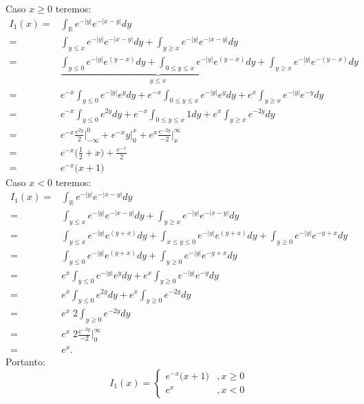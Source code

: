 \documentclass{article}
\begin{document}
\begin{enumerate}
\begin{enumerate}
\begin{enumerate}
\begin{enumerate}
						Caso $x \geq 0$ teremos:
						$$
						\begin{aligned}
						I_{1}(x) 
						= & \int_{\mathbb{R}}e^{-|y|}e^{-|x-y|} dy \\
						= & \int_{y \leq x }e^{-|y|}e^{-|x-y|} dy + \int_{y \geq x }e^{-|y|}e^{-|x-y|} dy \\
						= & \underbrace{ \int_{y \leq 0 }e^{-|y|}e^{(y-x)} dy + \int_{0 \leq y \leq x }e^{-|y|}e^{(y-x)} dy }_{ y \leq x} + \int_{y \geq x }e^{-|y|}e^{-(y-x)} dy \\
						= & e^{-x} \int_{y \leq 0 }e^{-|y|}e^{y} dy + e^{-x} \int_{0 \leq y \leq x }e^{-|y|}e^{y} dy + e^{x} \int_{y \geq x }e^{-|y|}e^{-y} dy \\
						= & e^{-x}\int_{y \leq 0}e^{2y} dy + e^{-x} \int_{0 \leq y \leq x } 1 dy  + e^{x} \int_{y \geq x}e^{-2y} dy \\
						= & e^{-x} \frac{e^{2y}}{2} \Big|^{0}_{-\infty} + e^{-x} y \Big|^{x}_{0} + e^{x} \frac{e^{-2y}}{-2} \Big|^{\infty}_{x} \\
						= & e^{-x} \Big(\frac{1}{2} + x \Big) + \frac{e^{-x}}{2} \\
						= & e^{-x} \Big( x + 1\Big) 
						\end{aligned}
						$$
						Caso $x < 0$ teremos:
						$$
						\begin{aligned}
						I_{1}(x) 
						= & \int_{\mathbb{R}}e^{-|y|}e^{-|x-y|} dy \\
						= & \int_{y \leq x }e^{-|y|}e^{-|x-y|} dy + \int_{y \geq x }e^{-|y|}e^{-|x-y|} dy \\
						= & \int_{y \leq x }e^{-|y|}e^{(y+x)} dy + \int_{x \leq y \leq 0 }e^{-|y|}e^{(y+x)} dy  + \int_{y \geq 0 }e^{-|y|}e^{-y + x} dy \\
						= & \int_{y \leq 0 }e^{-|y|}e^{(y+x)} dy + \int_{y \geq 0 }e^{-|y|}e^{-y +x} dy \\
						= & e^{x} \int_{y \leq 0 }e^{-|y|}e^{y} dy + e^{x}\int_{y \geq 0 }e^{-|y|}e^{-y} dy \\
						= & e^{x} \int_{y \leq 0 }e^{2y} dy + e^{x}\int_{y \geq 0 }e^{-2y} dy \\
						= & e^{x} \; 2 \int_{y \geq 0 }e^{-2y} dy \\
						= & e^{x} \; 2 \frac{e^{-2y}}{-2} \Big|^{\infty}_{0} \\
						= & e^{x}.
						\end{aligned}
						$$
						Portanto:
						$$
						I_{1}(x) = \left\{
						\begin{array}{cc}
						e^{-x} \Big( x + 1\Big) &, x \geq 0 \\
						e^{x}  &, x < 0
						\end{array}
						\right.
						$$
						

\end{enumerate}
\end{enumerate}
\end{enumerate}
\end{enumerate}
\end{document}
